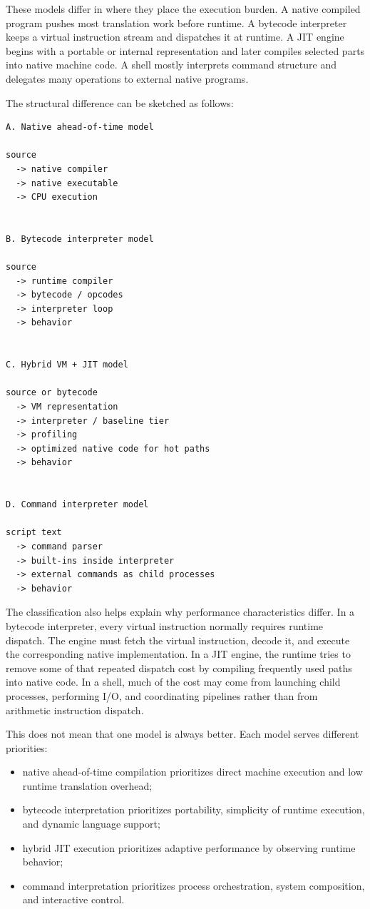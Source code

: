 \documentclass[a4paper,twoside]{report}
\begin{document}
These models differ in where they place the execution burden. A native compiled program pushes most translation work before runtime. A bytecode interpreter keeps a virtual instruction stream and dispatches it at runtime. A JIT engine begins with a portable or internal representation and later compiles selected parts into native machine code. A shell mostly interprets command structure and delegates many operations to external native programs.

The structural difference can be sketched as follows:

\begin{verbatim}
A. Native ahead-of-time model

source
  -> native compiler
  -> native executable
  -> CPU execution


B. Bytecode interpreter model

source
  -> runtime compiler
  -> bytecode / opcodes
  -> interpreter loop
  -> behavior


C. Hybrid VM + JIT model

source or bytecode
  -> VM representation
  -> interpreter / baseline tier
  -> profiling
  -> optimized native code for hot paths
  -> behavior


D. Command interpreter model

script text
  -> command parser
  -> built-ins inside interpreter
  -> external commands as child processes
  -> behavior
\end{verbatim}

The classification also helps explain why performance characteristics differ. In a bytecode interpreter, every virtual instruction normally requires runtime dispatch. The engine must fetch the virtual instruction, decode it, and execute the corresponding native implementation. In a JIT engine, the runtime tries to remove some of that repeated dispatch cost by compiling frequently used paths into native code. In a shell, much of the cost may come from launching child processes, performing I/O, and coordinating pipelines rather than from arithmetic instruction dispatch.

This does not mean that one model is always better. Each model serves different priorities:

\begin{itemize}
    \item native ahead-of-time compilation prioritizes direct machine execution and low runtime translation overhead;
    \item bytecode interpretation prioritizes portability, simplicity of runtime execution, and dynamic language support;
    \item hybrid JIT execution prioritizes adaptive performance by observing runtime behavior;
    \item command interpretation prioritizes process orchestration, system composition, and interactive control.
\end{itemize}
\end{document}

